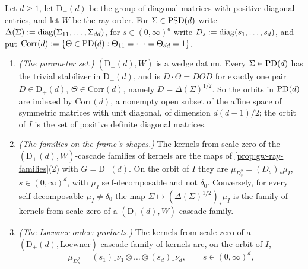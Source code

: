\begin{proposition}
\label{prop:diagonal-ray-families}
\leanok
Let $d \ge 1$, let $\mathrm D_+(d)$ be the group of diagonal matrices with positive diagonal entries, and
let $W$ be the ray order. For $\Sigma \in \mathrm{PSD}(d)$ write $\Delta(\Sigma) := \operatorname{diag}(\Sigma_{11}, \dots,
\Sigma_{dd})$, for $s \in (0,\infty)^d$ write $D_s := \operatorname{diag}(s_1, \dots, s_d)$, and put
$\mathrm{Corr}(d) := \{\Theta \in \mathrm{PD}(d) : \Theta_{11} = \dots = \Theta_{dd} = 1\}$.
\begin{enumerate}
\item \emph{(The parameter set.)} $(\mathrm D_+(d), W)$ is a wedge datum. Every $\Sigma \in \mathrm{PD}(d)$ has
the trivial stabilizer in $\mathrm D_+(d)$, and is $D\cdot \Theta = D\Theta D$ for exactly one pair
$D \in \mathrm D_+(d)$, $\Theta \in \mathrm{Corr}(d)$, namely $D = \Delta(\Sigma)^{1/2}$. So the orbits in
$\mathrm{PD}(d)$ are indexed by $\mathrm{Corr}(d)$, a nonempty open subset of the affine space of symmetric
matrices with unit diagonal, of dimension $d(d-1)/2$; the orbit of $I$ is the set of positive definite
diagonal matrices.
\item \emph{(The families on the frame's shapes.)} The kernels from scale zero of the
$(\mathrm D_+(d), W)$-cascade families of kernels are the maps of \ref{prop:gw-ray-families}(2) with
$G = \mathrm D_+(d)$. On the orbit of $I$ they are $\mu_{D_s^2} = (D_s)_*\mu_I$, $s \in (0,\infty)^d$, with
$\mu_I$ self-decomposable and not $\delta_0$. Conversely, for every self-decomposable $\mu_I \ne \delta_0$
the map $\Sigma \mapsto (\Delta(\Sigma)^{1/2})_*\mu_I$ is the family of kernels from scale zero of a
$(\mathrm D_+(d), W)$-cascade family.
\item \emph{(The Loewner order: products.)} The kernels from scale zero of a
$(\mathrm D_+(d), \text{Loewner})$-cascade family of kernels are, on the orbit of $I$,
\[
  \mu_{D_s^2} = (s_1)_*\nu_1 \otimes \dots \otimes (s_d)_*\nu_d , \qquad s \in (0,\infty)^d ,
\]
\end{enumerate}
\end{proposition}

